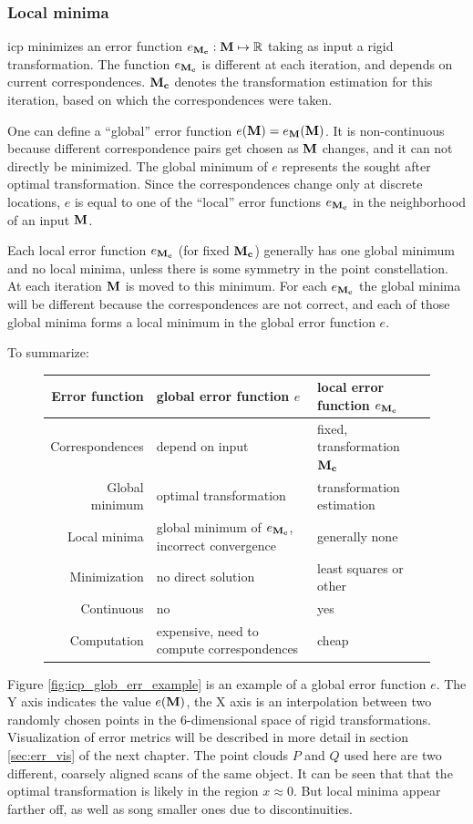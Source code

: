 \subsubsection{Local minima}
\gls{icp} minimizes an error function $e_{\mathbf{M_c}} : \mathbf{M} \mapsto \mathbb{R}$ taking as input a rigid transformation. The function $e_{\mathbf{M_c}}$ is different at each iteration, and depends on current correspondences. $\mathbf{M_c}$ denotes the transformation estimation for this iteration, based on which the correspondences were taken.

One can define a ``global'' error function $e(\mathbf{M}) = e_{\mathbf{M}}(\mathbf{M})$. It is non-continuous because different correspondence pairs get chosen as $\mathbf{M}$ changes, and it can not directly be minimized. The global minimum of $e$ represents the sought after optimal transformation. Since the correspondences change only at discrete locations, $e$ is equal to one of the ``local'' error functions $e_{\mathbf{M_c}}$ in the neighborhood of an input $\mathbf{M}$.

Each local error function $e_{\mathbf{M_c}}$ (for fixed $\mathbf{M_c}$) generally has one global minimum and no local minima, unless there is some symmetry in the point constellation. At each iteration $\mathbf{M}$ is moved to this minimum. For each $e_{\mathbf{M_c}}$ the global minima will be different because the correspondences are not correct, and each of those global minima forms a local minimum in the global error function $e$.

To summarize:
\begin{figure}[H]
\begin{tabular}{r|l|l}
Error function & global error function $e$ & local error function $e_{\mathbf{M_c}}$ \\ \hline
Correspondences & depend on input & fixed, transformation $\mathbf{M_c}$ \\
Global minimum & optimal transformation & transformation estimation \\
Local minima & global minimum of $e_{\mathbf{M_c}}$, incorrect convergence & generally none \\
Minimization & no direct solution & least squares or other \\
Continuous & no & yes \\
Computation & expensive, need to compute correspondences & cheap
\end{tabular}
\end{figure}

Figure \ref{fig:icp_glob_err_example} is an example of a global error function $e$. The Y axis indicates the value $e(\mathbf{M})$, the X axis is an interpolation between two randomly chosen points in the $6$-dimensional space of rigid transformations. Visualization of error metrics will be described in more detail in section \ref{sec:err_vis} of the next chapter. The point clouds $P$ and $Q$ used here are two different, coarsely aligned scans of the same object. It can be seen that that the optimal transformation is likely in the region $x \approx 0$. But local minima appear farther off, as well as song smaller ones due to discontinuities.

